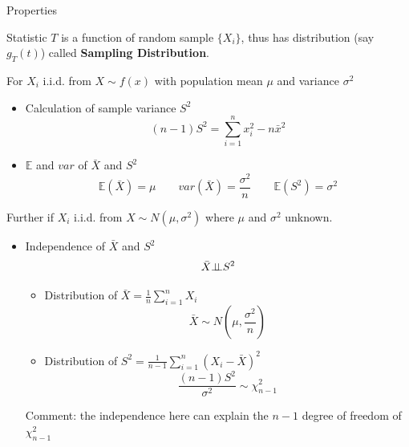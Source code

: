     \begin{point}
        Properties
    \end{point}
    
        

    Statistic $T$ is a function of random sample $\{X_i\}$, thus has distribution (say $g_T(t)$) called \textbf{Sampling Distribution}.

        For $X_i$ i.i.d. from $X\sim f(x)$ with population mean $\mu$ and variance $\sigma^2$
    \begin{itemize}
        \item Calculation of sample variance $S^2$
        \begin{equation}(n-1)S^2=\sum_{i=1}^n x_i^2-n\bar{x}^2\end{equation}
        \item $\mathbb{E}$ and $var$ of $\bar{X}$ and $S^2$
        \begin{equation}\mathbb{E}(\bar{X})=\mu\qquad var(\bar{X})=\frac{\sigma^2}{n}\qquad \mathbb{E}(S^2)=\sigma^2\end{equation}
    \end{itemize}

    Further if $X_i$ i.i.d. from $X\sim N(\mu,\sigma^2)$ where $\mu$ and $\sigma^2$ unknown.
    \begin{itemize}
        \item Independence of $\bar{X}$ and $S^2$ 
            \begin{equation}
            \bar{X}\bot\!\!\!\bot S^2
            \end{equation}
        \begin{itemize}[topsep=6pt,itemsep=4pt]
        \item Distribution of $\bar{X}={\displaystyle\frac{1}{n}\sum_{i=1}^n X_i}$
        \begin{equation}\bar{X}\sim N(\mu,\frac{\sigma^2}{n})\end{equation}
        \item Distribution of $S^2={\displaystyle\frac{1}{n-1}\sum_{i=1}^n(X_i-\bar{X})^2}$
        \begin{equation}\frac{(n-1)S^2}{\sigma^2}\sim\chi^2_{n-1}\end{equation}
        \end{itemize}     
        Comment: the independence here can explain the $ n-1 $ degree of freedom of $ \chi^2_{n-1} $   
    \end{itemize}

